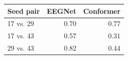 \begin{tabular}{@{}lrr@{}}\toprule
Seed pair & EEGNet & Conformer \\\midrule
17 vs. 29 & 0.70 & 0.77 \\
17 vs. 43 & 0.57 & 0.31 \\
29 vs. 43 & 0.82 & 0.44 \\
\bottomrule\end{tabular}
